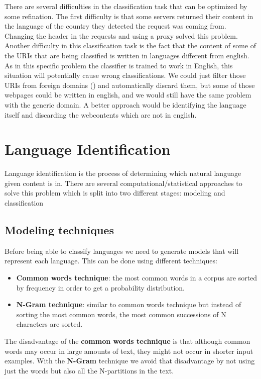 
There are several difficulties in the classification task that can be optimized by some refination. 
The first difficulty is that some servers returned their content in the language of the country they detected the request was coming from. Changing the header in the requests and using a proxy solved this problem.  
Another difficulty in this classification task is the fact that the content of some of the URIs that are being classified is written in languages different from english. 
As in this specific problem the classifier is trained to work in English, this situation will potentially cause wrong classifications. 
We could just filter those URIs from foreign domains () and automatically discard them, but some of those webpages could be written in english, and we would still have the same problem with the generic  domain.
A better approach would be identifying the language itself and discarding the webcontents which are not in english.

\section{Language Identification}
Language identification is the process of determining which natural language given content is in. 
There are several computational/statistical approaches to solve this problem which is split into two different stages: modeling and classification

\subsection{Modeling techniques}
Before being able to classify languages we need to generate models that will represent each language. This can be done using different techniques:
\begin{itemize}
  \item {\bf Common words technique}: the most common words in a corpus are sorted by frequency in order to get a probability distribution.
  \item {\bf N-Gram technique}: similar to common words technique but instead of sorting the most common words, the most common successions of N characters are sorted.
\end{itemize}  
The disadvantage of the {\bf common words technique} is that although common words may occur in large amounts of text, they might not occur in shorter input examples. With the {\bf N-Gram} technique we avoid that disadvantage by not using just the words but also all the N-partitions in the text.


